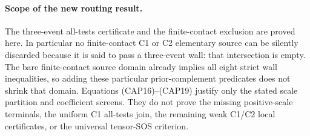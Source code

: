 \paragraph{Scope of the new routing result.}
The three-event all-tests certificate and the finite-contact exclusion
are proved here.  In particular no finite-contact C1 or C2 elementary
source can be silently discarded because it is said to pass a
three-event wall: that intersection is empty.  The bare finite-contact
source domain already implies all eight strict wall inequalities, so
adding these particular prior-complement predicates does not shrink
that domain.  Equations (CAP16)--(CAP19) justify only the stated scale
partition and coefficient screens.  They do not prove the missing
positive-scale terminals, the uniform C1 all-tests join, the remaining
weak C1/C2 local certificates, or the universal tensor-SOS criterion.
